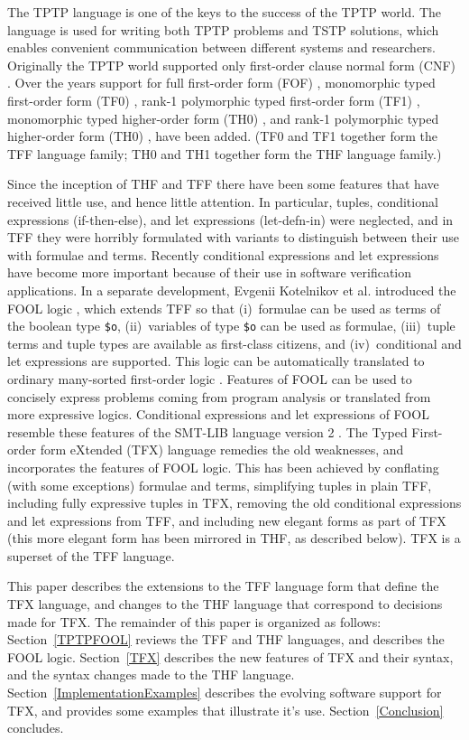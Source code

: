 \documentclass{easychair}
\begin{document}
The TPTP language is one of the keys to the success of the TPTP world.
The language is used for writing both TPTP problems and TSTP solutions,
which enables convenient communication between different systems and
researchers.
Originally the TPTP world supported only first-order clause normal form (CNF)
\cite{SS98-JAR}.
Over the years support for full first-order form (FOF) \cite{Sut09},
monomorphic typed first-order form (TF0) \cite{SS+12}, rank-1 polymorphic
typed first-order form (TF1) \cite{BP13-TFF1}, monomorphic typed higher-order 
form (TH0) \cite{SB10}, and rank-1 polymorphic typed higher-order form (TH0) 
\cite{KSR16}, have been added.
(TF0 and TF1 together form the TFF language family; TH0 and TH1 together form 
the THF language family.)

Since the inception of THF and TFF there have been some features that have 
received little use, and hence little attention. 
In particular, tuples, conditional expressions (if-then-else), and let 
expressions (let-defn-in) were neglected, and in TFF they were horribly 
formulated with variants to distinguish between their use with formulae and 
terms. 
Recently conditional expressions and let expressions have become more 
important because of their use in software verification applications.
In a separate development, Evgenii Kotelnikov et al. introduced the FOOL logic
\cite{KKV15}, which extends TFF so that (i)~formulae can be used as terms 
of the boolean type {\tt \$o}, (ii)~variables of type {\tt \$o} can be used 
as formulae, (iii)~tuple terms and tuple types are available as first-class 
citizens, and (iv)~conditional and let expressions are supported. 
This logic can be automatically translated to ordinary many-sorted first-order
logic \cite{KK+16-GCAI}.
Features of FOOL can be used to concisely express problems coming from program
analysis \cite{KKV18} or translated from more expressive logics.
Conditional expressions and let expressions of FOOL resemble these features of
the SMT-LIB language version 2 \cite{BST10}.
The Typed First-order form eXtended (TFX) language remedies the
old weaknesses, and incorporates the features of FOOL logic.
This has been achieved by conflating (with some exceptions) formulae and 
terms, simplifying tuples in plain TFF, including fully expressive tuples in 
TFX, removing the old conditional expressions and let expressions from 
TFF, and including new elegant forms as part of TFX
(this more elegant form has been mirrored in THF, as described below).
TFX is a superset of the TFF language. 

This paper describes the extensions to the TFF language form that define the 
TFX language, and changes to the THF language that correspond to decisions 
made for TFX.
The remainder of this paper is organized as follows:
Section~\ref{TPTPFOOL} reviews the TFF and THF languages, and
describes the FOOL logic.
Section~\ref{TFX} describes the new features of TFX and their syntax, and 
the syntax changes made to the THF language.
Section~\ref{ImplementationExamples} describes the evolving software 
support for TFX, and provides some examples that illustrate it's use.
Section~\ref{Conclusion} concludes.
\end{document}

